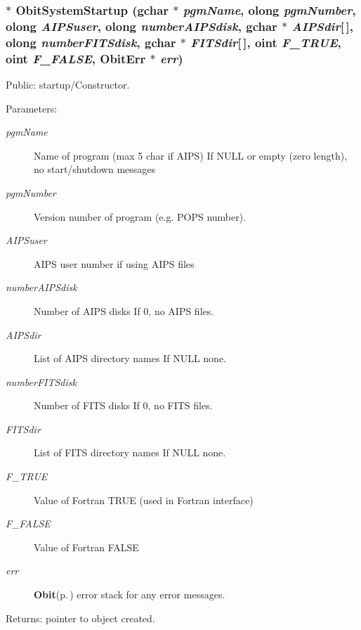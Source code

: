 \subsubsection{$\ast$ Obit\-System\-Startup (gchar $\ast$ {\em pgm\-Name}, {\bf olong} {\em pgm\-Number}, {\bf olong} {\em AIPSuser}, {\bf olong} {\em number\-AIPSdisk}, gchar $\ast$ {\em AIPSdir}[$\,$], {\bf olong} {\em number\-FITSdisk}, gchar $\ast$ {\em FITSdir}[$\,$], {\bf oint} {\em F\_\-TRUE}, {\bf oint} {\em F\_\-FALSE}, {\bf Obit\-Err} $\ast$ {\em err})}\label{ObitSystem_8c_a14}


Public: startup/Constructor. 

\begin{Desc}
\item[Parameters:]
\begin{description}
\item[{\em pgm\-Name}]Name of program (max 5 char if AIPS) If NULL or empty (zero length), no start/shutdown messages \item[{\em pgm\-Number}]Version number of program (e.g. POPS number). \item[{\em AIPSuser}]AIPS user number if using AIPS files \item[{\em number\-AIPSdisk}]Number of AIPS disks If 0, no AIPS files. \item[{\em AIPSdir}]List of AIPS directory names If NULL none. \item[{\em number\-FITSdisk}]Number of FITS disks If 0, no FITS files. \item[{\em FITSdir}]List of FITS directory names If NULL none. \item[{\em F\_\-TRUE}]Value of Fortran TRUE (used in Fortran interface) \item[{\em F\_\-FALSE}]Value of Fortran FALSE \item[{\em err}]{\bf Obit}{\rm (p.\,\pageref{structObit})} error stack for any error messages. \end{description}
\end{Desc}
\begin{Desc}
\item[Returns:]pointer to object created. \end{Desc}
